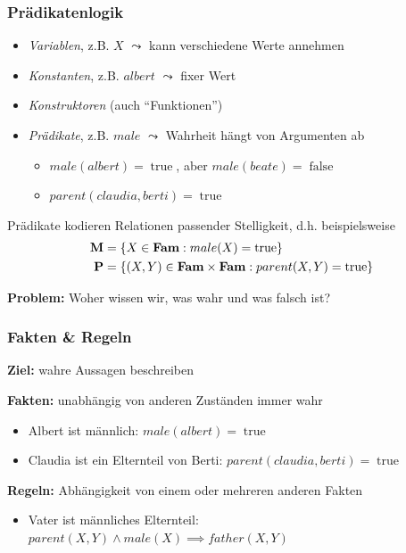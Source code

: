 \documentclass{beamer}
\newcommand{\true}{\operatorname{true}}
\newcommand{\false}{\operatorname{false}}
\newcommand{\operator}[1]{\textbf{\textcolor{black}{#1}}}
\newcommand{\Fam}{\operator{Fam}}
\begin{document}
\begin{frame} \frametitle{Prädikatenlogik}
	\footnotesize
	\begin{itemize}
		\item \textit{Variablen}, z.B. $X$ $\leadsto$ kann verschiedene Werte annehmen
		\item \textit{Konstanten}, z.B. $albert$ $\leadsto$ fixer Wert
		\item \textit{Konstruktoren} (auch \enquote{Funktionen})
		\item \textit{Prädikate}, z.B. $male$ $\leadsto$ Wahrheit hängt von Argumenten ab 
		\begin{itemize} \footnotesize
			\item $male(albert) = \true$, aber $male(beate) = \false$
			\item $parent(claudia, berti) = \true$
		\end{itemize}
	\end{itemize}
	
	Prädikate kodieren Relationen passender Stelligkeit, d.h. beispielsweise
	\begin{align*}
		\operator{M} &= \menge{X \in \Fam : male(X) = \true} \\
		\operator{P} &= \menge{(X,Y) \in \Fam \times \Fam : parent(X,Y) = \true}
	\end{align*}

	\textbf{Problem:} Woher wissen wir, was wahr und was falsch ist?
\end{frame}

\begin{frame} \frametitle{Fakten \& Regeln}
	\footnotesize
	
	\textbf{Ziel:} wahre Aussagen beschreiben
	\bigskip
	
	\textbf{Fakten:} unabhängig von anderen Zuständen immer wahr
	\begin{itemize}
		\item Albert ist männlich: $male(albert) = \true$
		\item Claudia ist ein Elternteil von Berti: $parent(claudia, berti) = \true$
	\end{itemize}
	
	\textbf{Regeln:} Abhängigkeit von einem oder mehreren anderen Fakten
	\begin{itemize}
		\item Vater ist männliches Elternteil:
		$parent(X,Y) \land male(X) \implies father(X,Y)$ 
	\end{itemize}
\end{frame}
\end{document}
